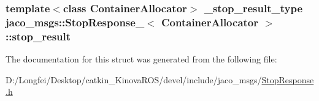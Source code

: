 \subsubsection[{\texorpdfstring{stop\+\_\+result}{stop_result}}]{\setlength{\rightskip}{0pt plus 5cm}template$<$class Container\+Allocator$>$ {\bf \+\_\+stop\+\_\+result\+\_\+type} {\bf jaco\+\_\+msgs\+::\+Stop\+Response\+\_\+}$<$ Container\+Allocator $>$\+::stop\+\_\+result}\hypertarget{structjaco__msgs_1_1StopResponse___a9dc418ecf2ecbae176732d3fdf6e7b66}{}\label{structjaco__msgs_1_1StopResponse___a9dc418ecf2ecbae176732d3fdf6e7b66}


The documentation for this struct was generated from the following file\+:\begin{DoxyCompactItemize}
\item 
D\+:/\+Longfei/\+Desktop/catkin\+\_\+\+Kinova\+R\+O\+S/devel/include/jaco\+\_\+msgs/\hyperlink{StopResponse_8h}{Stop\+Response.\+h}\end{DoxyCompactItemize}
